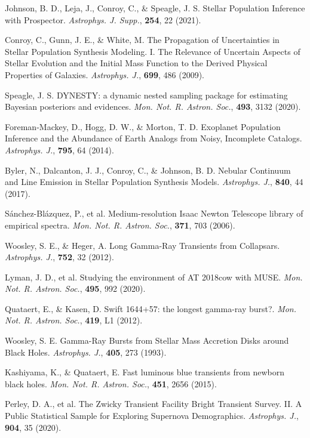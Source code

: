 \documentclass{nature_plusfigure}
\newcommand{\mn}{{Mon. Not. R. Astron. Soc.}}
\newcommand{\mnras}{\mn}
\newcommand{\apj}{{Astrophys. J.}}
\newcommand{\apjs}{{Astrophys. J. Supp.}}
\begin{document}
\begin{methods}
\begin{thebibliography}{10}
  Johnson, B. D., Leja, J., Conroy, C., \& Speagle, J. S. Stellar Population Inference with Prospector. \emph{\apjs}, \textbf{254}, 22 (2021). 

  Conroy, C., Gunn, J. E., \& White, M. The Propagation of Uncertainties in Stellar Population Synthesis Modeling. I. The Relevance of Uncertain Aspects of Stellar Evolution and the Initial Mass Function to the Derived Physical Properties of Galaxies. \emph{\apj}, \textbf{699}, 486 (2009). 

 Speagle, J. S. DYNESTY: a dynamic nested sampling package for estimating Bayesian posteriors and evidences. \emph{\mnras}, \textbf{493}, 3132 (2020). 

 Foreman-Mackey, D., Hogg, D. W., \& Morton, T. D. Exoplanet Population Inference and the Abundance of Earth Analogs from Noisy, Incomplete Catalogs. \emph{\apj}, \textbf{795}, 64 (2014). 
 
  Byler, N., Dalcanton, J. J., Conroy, C., \& Johnson, B. D. Nebular Continuum and Line Emission in Stellar Population Synthesis Models. \emph{\apj}, \textbf{840}, 44 (2017). 

  Sánchez-Blázquez, P., et al. Medium-resolution Isaac Newton Telescope library of empirical spectra. \emph{\mnras}, \textbf{371}, 703 (2006). 
 
 
  Woosley, S. E., \& Heger, A. Long Gamma-Ray Transients from Collapsars. \emph{\apj}, \textbf{752}, 32 (2012). 
 
  Lyman, J. D., et al. Studying the environment of AT 2018cow with MUSE. \emph{\mnras}, \textbf{495}, 992 (2020). 

  Quataert, E., \& Kasen, D. Swift 1644+57: the longest gamma-ray burst?. \emph{\mnras}, \textbf{419}, L1 (2012). 

 Woosley, S. E. Gamma-Ray Bursts from Stellar Mass Accretion Disks around Black Holes. \emph{\apj}, \textbf{405}, 273 (1993). 

 Kashiyama, K., \& Quataert, E. Fast luminous blue transients from newborn black holes. \emph{\mnras}, \textbf{451}, 2656 (2015). 


 
  Perley, D. A., et al. The Zwicky Transient Facility Bright Transient Survey. II. A Public Statistical Sample for Exploring Supernova Demographics. \emph{\apj}, \textbf{904}, 35 (2020). 
 

\end{thebibliography}
\end{methods}
\end{document}
